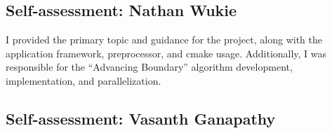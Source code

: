 \documentclass[]{aiaa-tc}%
\begin{document}
\subsection{Self-assessment: Nathan Wukie}
I provided the primary topic and guidance for the project, along with
the application framework, preprocessor, and cmake
usage. Additionally, I was responsible for the ``Advancing Boundary''
algorithm development, implementation, and parallelization.

\subsection{Self-assessment: Vasanth Ganapathy}


\nocite{*}


\end{document}
